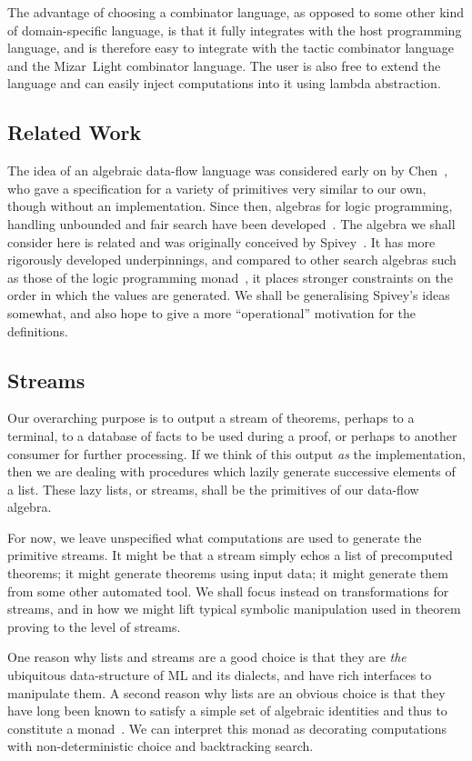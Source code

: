 The advantage of choosing a combinator language, as opposed to some other kind of domain-specific language, is that it fully integrates with the host programming language, and is therefore easy to integrate with the tactic combinator language and the Mizar~Light combinator language. The user is also free to extend the language and can easily inject computations into it using lambda abstraction.

\subsection{Related Work}
The idea of an algebraic data-flow language was considered early on by Chen~\cite{ChenForwardChaining}, who gave a specification for a variety of primitives very similar to our own, though without an implementation. Since then, algebras for logic programming, handling unbounded and fair search have been developed~\cite{BacktrackingMonad}. The algebra we shall consider here is related and was originally conceived by Spivey~\cite{SearchAlgebras}. It has more rigorously developed underpinnings, and compared to other search algebras such as those of the logic programming monad~\cite{BacktrackingMonad}, it places stronger constraints on the order in which the values are generated. We shall be generalising Spivey's ideas somewhat, and also hope to give a more ``operational'' motivation for the definitions.

\subsection{Streams}\label{sec:Streams}
Our overarching purpose is to output a stream of theorems, perhaps to a terminal, to a database of facts to be used during a proof, or perhaps to another consumer for further processing. If we think of this output \emph{as} the implementation, then we are dealing with procedures which lazily generate successive elements of a list. These lazy lists, or streams, shall be the primitives of our data-flow algebra. 

For now, we leave unspecified what computations are used to generate the primitive streams. It might be that a stream simply echos a list of precomputed theorems; it might generate theorems using input data; it might generate them from some other automated tool. We shall focus instead on transformations for streams, and in how we might lift typical symbolic manipulation used in theorem proving to the level of streams.

One reason why lists and streams are a good choice is that they are \emph{the} ubiquitous data-structure of ML and its dialects, and have rich interfaces to manipulate them. A second reason why lists are an obvious choice is that they have long been known to satisfy a simple set of algebraic identities and thus to constitute a monad~\cite{MonadWadler}. We can interpret this monad as decorating computations with non-deterministic choice and backtracking search. 

